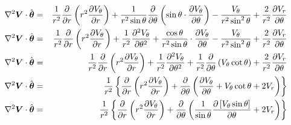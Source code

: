 \begin{eqnarray}
\nabla^2 \boldsymbol{V} \cdot \hat{\boldsymbol{\theta}} &=&
\frac{1}{r^2}\frac{\partial }{\partial r}\left( r^2 \frac{\partial V_\theta}{\partial r} \right) + \frac{1}{r^2 \sin\theta} \frac{\partial }{\partial \theta} \left( \sin\theta \cdot \frac{\partial V_\theta}{\partial \theta}\right)
 - \frac{V_\theta}{r^2 \sin^2\theta} + \frac{2}{r^2}\frac{\partial V_r}{\partial \theta}
\\
\nabla^2 \boldsymbol{V} \cdot \hat{\boldsymbol{\theta}} &=&
\frac{1}{r^2}\frac{\partial }{\partial r}\left( r^2 \frac{\partial V_\theta}{\partial r} \right)
+ \frac{1}{r^2} \frac{\partial ^2 V_\theta}{\partial \theta^2}
+ \frac{\cos\theta}{r^2 \sin\theta} \cdot \frac{\partial V_\theta}{\partial \theta}
 - \frac{V_\theta}{r^2 \sin^2\theta} + \frac{2}{r^2}\frac{\partial V_r}{\partial \theta}
\\
\nabla^2 \boldsymbol{V} \cdot \hat{\boldsymbol{\theta}} &=&
\frac{1}{r^2}\frac{\partial }{\partial r}\left( r^2 \frac{\partial V_\theta}{\partial r} \right)
+ \frac{1}{r^2} \frac{\partial ^2 V_\theta}{\partial \theta^2}
+ \frac{1}{r^2} \frac{\partial }{\partial \theta}
                 \left(V_\theta \cot\theta\right)
 + \frac{2}{r^2}\frac{\partial V_r}{\partial \theta}
\\
\nabla^2 \boldsymbol{V} \cdot \hat{\boldsymbol{\theta}} &=& \frac{1}{r^2} \left\{
\frac{\partial }{\partial r}\left( r^2 \frac{\partial V_\theta}{\partial r} \right)
+ \frac{\partial }{\partial \theta} \left(\frac{\partial V_\theta}{\partial \theta}
+ V_\theta \cot\theta + 2V_r \right) \right\}
\\
\nabla^2 \boldsymbol{V} \cdot \hat{\boldsymbol{\theta}} &=& \frac{1}{r^2} \left\{
\frac{\partial }{\partial r}\left( r^2 \frac{\partial V_\theta}{\partial r} \right)
+ \frac{\partial }{\partial \theta} \left( \frac{1}{\sin\theta}
\frac{\partial \left[V_\theta \sin\theta\right]}{\partial \theta}
+ 2V_r \right) \right\}
\end{eqnarray}
